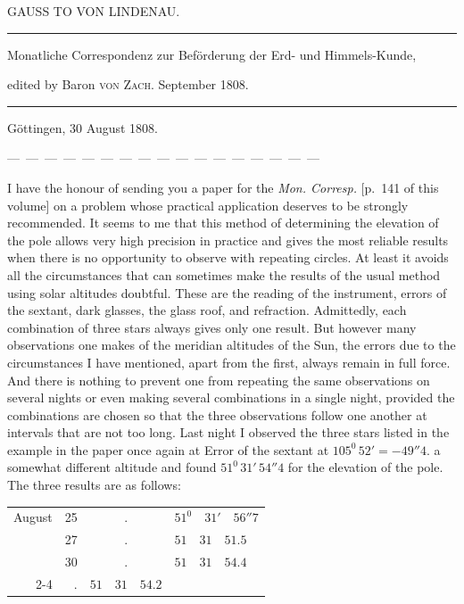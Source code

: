 \clearpage{}%
\begin{center}
{\small GAUSS TO VON LINDENAU.\par}
\medskip\hrule\medskip
{\small Monatliche Correspondenz zur Beförderung der Erd- und Himmels-Kunde,\par
edited by Baron \textsc{von Zach}. September 1808.\par}
\medskip\hrule
\end{center}\medskip
\begin{flushright}Göttingen, 30 August 1808.\end{flushright}
\begin{center}\small
—\ —\ —\ —\ —\ —\ —\ —\ —\ —\ —\ —\ —\ —\ —\ —\ —
\end{center}
I have the honour of sending you a paper for the \emph{Mon. Corresp.} [p.\ 141 of this volume] on a problem whose practical application deserves to be strongly recommended. It seems to me that this method of determining the elevation of the pole allows very high precision in practice and gives the most reliable results when there is no opportunity to observe with repeating circles. At least it avoids all the circumstances that can sometimes make the results of the usual method using solar altitudes doubtful. These are the reading of the instrument, errors of the sextant, dark glasses, the glass roof, and refraction. Admittedly, each combination of three stars always gives only one result. But however many observations one makes of the meridian altitudes of the Sun, the errors due to the circumstances I have mentioned, apart from the first, always remain in full force. And there is nothing to prevent one from repeating the same observations on several nights or even making several combinations in a single night, provided the combinations are chosen so that the three observations follow one another at intervals that are not too long. Last night I observed the three stars listed in the example in the paper once again at
%
\expandafter\def\csname HistoricalNoteText7\endcsname{Error of the sextant at $105^0\,52'= -49''4$.}%
a somewhat different altitude and found $51^0\,31'\,54''4$ for the elevation of the pole. The three results are as follows:
\begin{center}
\begin{tabular}{@{}r@{\ }r@{\quad}c@{\quad}l@{}}
August & 25 & $.$ & $51^0\quad31'\quad56''7$\\
       & 27 & $.$ & $51\quad31\quad51.5$\\
       & 30 & $.$ & $51\quad31\quad54.4$\\\cline{2-4}
\multicolumn{2}{@{}r@{\quad}}{mean} & $.$ & $51\quad31\quad54.2$
\end{tabular}
\end{center}
